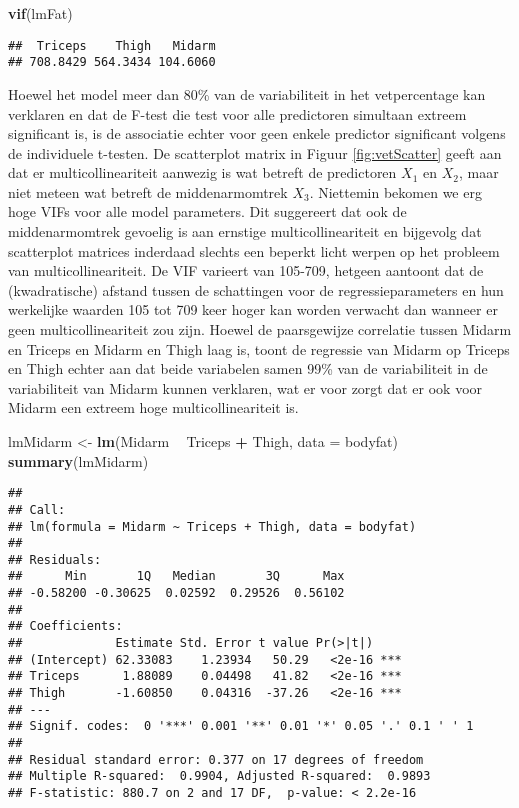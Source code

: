 \documentclass[12pt,dutch,coursenotes]{book}
\newenvironment{Shaded}{\begin{snugshade}}{\end{snugshade}}
\newcommand{\KeywordTok}[1]{\textcolor[rgb]{0.13,0.29,0.53}{\textbf{#1}}}
\newcommand{\DataTypeTok}[1]{\textcolor[rgb]{0.13,0.29,0.53}{#1}}
\newcommand{\StringTok}[1]{\textcolor[rgb]{0.31,0.60,0.02}{#1}}
\newcommand{\OperatorTok}[1]{\textcolor[rgb]{0.81,0.36,0.00}{\textbf{#1}}}
\newcommand{\NormalTok}[1]{#1}
\theoremstyle{definition}
\theoremstyle{definition}
\theoremstyle{definition}
\theoremstyle{remark}
\begin{document}
\begin{Shaded}
\begin{Highlighting}[]
\KeywordTok{vif}\NormalTok{(lmFat)}
\end{Highlighting}
\end{Shaded}

\begin{verbatim}
##  Triceps    Thigh   Midarm 
## 708.8429 564.3434 104.6060
\end{verbatim}

Hoewel het model meer dan 80\% van de variabiliteit in het vetpercentage
kan verklaren en dat de F-test die test voor alle predictoren simultaan
extreem significant is, is de associatie echter voor geen enkele
predictor significant volgens de individuele t-testen. De scatterplot
matrix in Figuur \ref{fig:vetScatter} geeft aan dat er
multicollineariteit aanwezig is wat betreft de predictoren \(X_1\) en
\(X_2\), maar niet meteen wat betreft de middenarmomtrek \(X_3\).
Niettemin bekomen we erg hoge VIFs voor alle model parameters. Dit
suggereert dat ook de middenarmomtrek gevoelig is aan ernstige
multicollineariteit en bijgevolg dat scatterplot matrices inderdaad
slechts een beperkt licht werpen op het probleem van
multicollineariteit. De VIF varieert van 105-709, hetgeen aantoont dat
de (kwadratische) afstand tussen de schattingen voor de
regressieparameters en hun werkelijke waarden 105 tot 709 keer hoger kan
worden verwacht dan wanneer er geen multicollineariteit zou zijn. Hoewel
de paarsgewijze correlatie tussen Midarm en Triceps en Midarm en Thigh
laag is, toont de regressie van Midarm op Triceps en Thigh echter aan
dat beide variabelen samen 99\% van de variabiliteit in de variabiliteit
van Midarm kunnen verklaren, wat er voor zorgt dat er ook voor Midarm
een extreem hoge multicollineariteit is.

\begin{Shaded}
\begin{Highlighting}[]
\NormalTok{lmMidarm <-}\StringTok{ }\KeywordTok{lm}\NormalTok{(Midarm }\OperatorTok{~}\StringTok{ }\NormalTok{Triceps }\OperatorTok{+}\StringTok{ }\NormalTok{Thigh, }\DataTypeTok{data =}\NormalTok{ bodyfat)}
\KeywordTok{summary}\NormalTok{(lmMidarm)}
\end{Highlighting}
\end{Shaded}

\begin{verbatim}
## 
## Call:
## lm(formula = Midarm ~ Triceps + Thigh, data = bodyfat)
## 
## Residuals:
##      Min       1Q   Median       3Q      Max 
## -0.58200 -0.30625  0.02592  0.29526  0.56102 
## 
## Coefficients:
##             Estimate Std. Error t value Pr(>|t|)    
## (Intercept) 62.33083    1.23934   50.29   <2e-16 ***
## Triceps      1.88089    0.04498   41.82   <2e-16 ***
## Thigh       -1.60850    0.04316  -37.26   <2e-16 ***
## ---
## Signif. codes:  0 '***' 0.001 '**' 0.01 '*' 0.05 '.' 0.1 ' ' 1
## 
## Residual standard error: 0.377 on 17 degrees of freedom
## Multiple R-squared:  0.9904, Adjusted R-squared:  0.9893 
## F-statistic: 880.7 on 2 and 17 DF,  p-value: < 2.2e-16
\end{verbatim}
\end{document}
